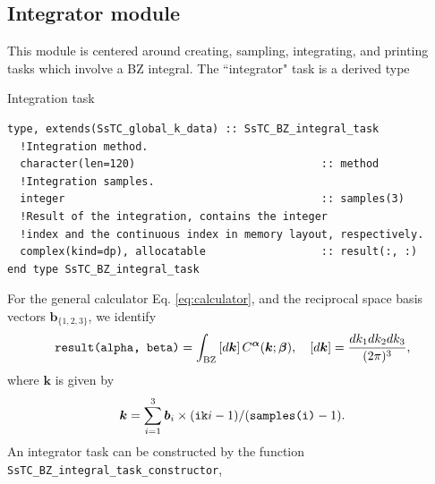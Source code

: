 \documentclass[10pt,a4paper]{article}
\begin{document}
\subsection{Integrator module}
This module is centered around creating, sampling, integrating, and printing tasks which involve a BZ integral. The ``integrator" task is a derived type
\begin{codebox}{Integration task}
\begin{lstlisting}[caption={Derived type corresponding to an integrator task.},captionpos=b]
type, extends(SsTC_global_k_data) :: SsTC_BZ_integral_task
  !Integration method.
  character(len=120)                             :: method
  !Integration samples.
  integer                                        :: samples(3)
  !Result of the integration, contains the integer
  !index and the continuous index in memory layout, respectively.
  complex(kind=dp), allocatable                  :: result(:, :)
end type SsTC_BZ_integral_task
\end{lstlisting}
\end{codebox}
For the general calculator Eq. \eqref{eq:calculator}, and the reciprocal space basis vectors $\bm{b}_{\{1, 2, 3\}}$, we identify
\begin{equation}\label{eq:integrator}
\verb|result(alpha, beta)| = \int_{\text{BZ}} \left[d\bm{k}\right]C^{\bm{\alpha}}(\bm{k}; \bm{\beta}),\quad \left[d\bm{k}\right] = \frac{dk_1 dk_2 dk_3}{(2\pi)^3},
\end{equation}
where $\bm{k}$ is given by
\begin{equation}\label{eq:vec_coords_integrator}
\bm{k} = \sum_{i=1}^3 \bm{b}_i\times (\verb|ik|i-1)/(\verb|samples(i)| - 1).
\end{equation}
An integrator task can be constructed by the function \verb|SsTC_BZ_integral_task_constructor|,
\end{document}
